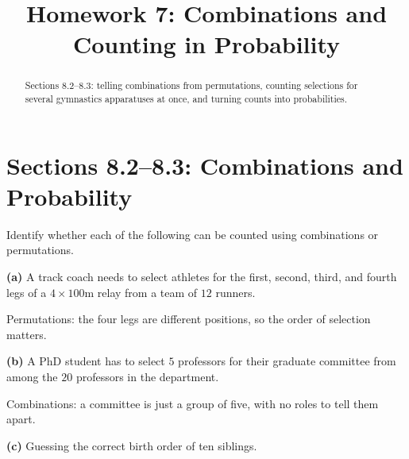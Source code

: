 \documentclass[12pt]{ximera}
\title{Homework 7: Combinations and Counting in Probability}
\begin{document}
\begin{abstract}
Sections 8.2--8.3: telling combinations from permutations, counting selections for
several gymnastics apparatuses at once, and turning counts into probabilities.
\end{abstract}
\maketitle

\section*{Sections 8.2--8.3: Combinations and Probability}

\begin{problem}
Identify whether each of the following can be counted using combinations or
permutations.

\begin{prompt}
\textbf{(a)} A track coach needs to select athletes for the first, second, third, and
fourth legs of a $4\times 100\text{m}$ relay from a team of $12$ runners.

\begin{multipleChoice}
\end{multipleChoice}

\begin{feedback}
Permutations: the four legs are different positions, so the order of selection
matters.
\end{feedback}
\end{prompt}

\begin{prompt}
\textbf{(b)} A PhD student has to select $5$ professors for their graduate committee
from among the $20$ professors in the department.

\begin{multipleChoice}
\end{multipleChoice}

\begin{feedback}
Combinations: a committee is just a group of five, with no roles to tell them apart.
\end{feedback}
\end{prompt}

\begin{prompt}
\textbf{(c)} Guessing the correct birth order of ten siblings.


\end{prompt}
\end{problem}
\end{document}
